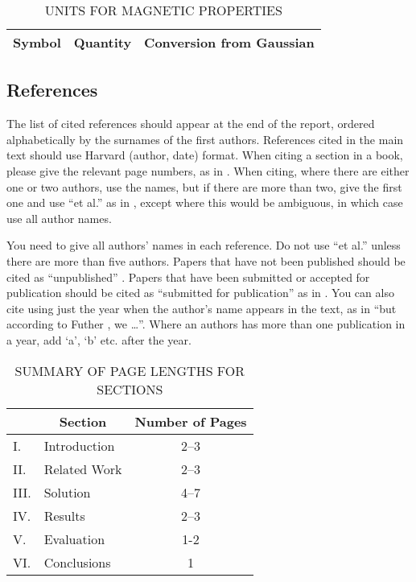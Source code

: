 \documentclass[12pt,a4paper]{article}
\begin{document}
\begin{table}[htb]
\centering
\caption{UNITS FOR MAGNETIC PROPERTIES}
\vspace*{6pt}
\label{units}
\begin{tabular}{ccc}\hline\hline
Symbol & Quantity & Conversion from Gaussian \\ \hline
\end{tabular}
\end{table}

\subsection{References}

The list of cited references should appear at the end of the report, ordered alphabetically by the surnames of the first authors.  References cited in the main text should use Harvard (author, date) format.  When citing a section in a book, please give the relevant page numbers, as in \cite[p293]{budgen}.  When citing, where there are either one or two authors, use the names, but if there are more than two, give the first one and use ``et al.'' as in  , except where this would be ambiguous, in which case use all author names.

You need to give all authors' names in each reference.  Do not use ``et al.'' unless there are more than five authors.  Papers that have not been published should be cited as ``unpublished'' \cite{euther}.  Papers that have been submitted or accepted for publication should be cited as ``submitted for publication'' as in \cite{futher} .  You can also cite using just the year when the author's name appears in the text, as in ``but according to Futher \citeyear{futher}, we \dots''.  Where an authors has more than one publication in a year, add `a', `b' etc. after the year.

\iffalse
#################################################################################
\fi

\begin{table}[htb]
\centering
\caption{SUMMARY OF PAGE LENGTHS FOR SECTIONS}
\vspace*{6pt}
\label{summary}
\begin{tabular}{|ll|c|} \hline
& \multicolumn{1}{c|}{\bf Section} & {\bf Number of Pages} \\ \hline
I. & Introduction & 2--3 \\ \hline
II. & Related Work & 2--3 \\ \hline
III. & Solution & 4--7 \\ \hline
IV. & Results & 2--3 \\ \hline
V. & Evaluation & 1-2 \\ \hline
VI. & Conclusions & 1 \\ \hline
\end{tabular}
\end{table}
\end{document}
